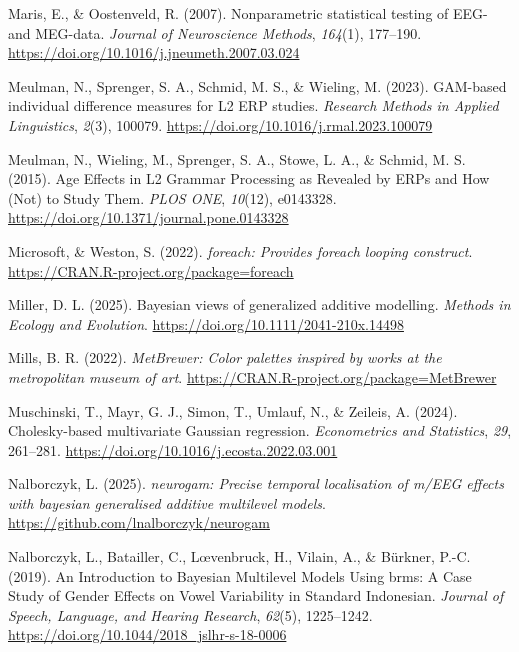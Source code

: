 \documentclass[
  doc,
  floatsintext,
  longtable,
  a4paper,
  nolmodern,
  notxfonts,
  notimes,
  donotrepeattitle,
  colorlinks=true,linkcolor=blue,citecolor=blue,urlcolor=blue]{apa7}
\newlength{\cslhangindent}
\newenvironment{CSLReferences}[2] %
 {\begin{list}{}{%
  \setlength{\itemindent}{0pt}
  \setlength{\leftmargin}{0pt}
  \setlength{\parsep}{0pt}
  \ifodd #1
   \setlength{\leftmargin}{\cslhangindent}
   \setlength{\itemindent}{-1\cslhangindent}
  \fi
  \setlength{\itemsep}{#2\baselineskip}}}
 {\end{list}}
\begin{document}
\begin{CSLReferences}{1}{0}
Maris, E., \& Oostenveld, R. (2007). Nonparametric statistical testing
of EEG- and MEG-data. \emph{Journal of Neuroscience Methods},
\emph{164}(1), 177--190.
\url{https://doi.org/10.1016/j.jneumeth.2007.03.024}

Meulman, N., Sprenger, S. A., Schmid, M. S., \& Wieling, M. (2023).
GAM-based individual difference measures for L2 ERP studies.
\emph{Research Methods in Applied Linguistics}, \emph{2}(3), 100079.
\url{https://doi.org/10.1016/j.rmal.2023.100079}

Meulman, N., Wieling, M., Sprenger, S. A., Stowe, L. A., \& Schmid, M.
S. (2015). Age Effects in L2 Grammar Processing as Revealed by ERPs and
How (Not) to Study Them. \emph{PLOS ONE}, \emph{10}(12), e0143328.
\url{https://doi.org/10.1371/journal.pone.0143328}

Microsoft, \& Weston, S. (2022). \emph{{foreach}: Provides foreach
looping construct}. \url{https://CRAN.R-project.org/package=foreach}

Miller, D. L. (2025). Bayesian views of generalized additive modelling.
\emph{Methods in Ecology and Evolution}.
\url{https://doi.org/10.1111/2041-210x.14498}

Mills, B. R. (2022). \emph{{MetBrewer}: Color palettes inspired by works
at the metropolitan museum of art}.
\url{https://CRAN.R-project.org/package=MetBrewer}

Muschinski, T., Mayr, G. J., Simon, T., Umlauf, N., \& Zeileis, A.
(2024). Cholesky-based multivariate {G}aussian regression.
\emph{Econometrics and Statistics}, \emph{29}, 261--281.
\url{https://doi.org/10.1016/j.ecosta.2022.03.001}

Nalborczyk, L. (2025). \emph{{neurogam}: Precise temporal localisation
of m/EEG effects with bayesian generalised additive multilevel models}.
\url{https://github.com/lnalborczyk/neurogam}

Nalborczyk, L., Batailler, C., Lœvenbruck, H., Vilain, A., \& Bürkner,
P.-C. (2019). An Introduction to Bayesian Multilevel Models Using brms:
A Case Study of Gender Effects on Vowel Variability in Standard
Indonesian. \emph{Journal of Speech, Language, and Hearing Research},
\emph{62}(5), 1225--1242.
\url{https://doi.org/10.1044/2018_jslhr-s-18-0006}


\end{CSLReferences}
\end{document}
